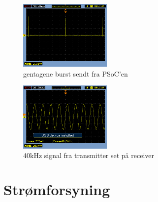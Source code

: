 \begin{figure}[hbpt]
\centering
\includegraphics[width = 0.4\textwidth]{billeder/gentageneburst}
\caption{gentagene burst sendt fra PSoC'en}
\label{fig:burstpsoc}
\end{figure}
\begin{figure}[hbpt]
\centering
\includegraphics[width = 0.4\textwidth]{billeder/transmittertest}
\caption{40kHz signal fra transmitter set på receiver}
\label{fig:transmittertest}
\end{figure}
\newpage
\section{Strømforsyning}
